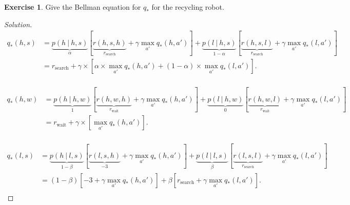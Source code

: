 \documentclass[oneside,11pt]{article}
\theoremstyle{definition}
\newtheorem{exer}[thm]{Exercise}
\newcommand{\qstar}{q_{\ast}}
\newcommand\givenbase[1][]{\:#1\lvert\:}
\let\given\givenbase
\newenvironment{solution}
{\renewcommand\qedsymbol{$\blacksquare$}\begin{proof}[Solution]} {\end{proof}}
\begin{document}
\begin{exer}
Give the Bellman equation for $q_{\ast}$ for the recycling robot.
\end{exer}

\begin{shaded}
\begin{solution} 

\begin{equation*} %
\begin{split}
\qstar(h,s) & = \underbrace{p(h \given h,s)}_{ \alpha} \left [ \underbrace{r(h,s,h)}_{r_{\text{search}}} + \gamma \max_{a'} \qstar(h,a')  \right ] + \underbrace{p(l \given h,s)}_{1- \alpha} \left[ \underbrace{r(h,s,l)}_{r_{\text{search}}} + \gamma \max_{a'} \qstar(l,a') \right ]\\
 & = r_{\text{search}} + \gamma \times \left [ \alpha \times \max_{a'} \qstar(h,a') + (1- \alpha) \times \max_{a'} \qstar(l,a')  \right ]. \\
\end{split}
\end{equation*}


\begin{equation*} %
\begin{split}
\qstar(h,w) & = \underbrace{p(h \given h,w)}_{ 1} \left [ \underbrace{r(h,w,h)}_{r_{\text{wait}}} + \gamma \max_{a'} \qstar(h,a')  \right ] + \underbrace{p(l \given h, w)}_{0} \left[ \underbrace{r(h,w,l)}_{r_{\text{wait}}} + \gamma \max_{a'} \qstar(l,a') \right ]\\
 & = r_{\text{wait}} + \gamma \times \left [ \max_{a'} \qstar(h,a')  \right ]. \\
\end{split}
\end{equation*}

\begin{equation*} %
\begin{split}
\qstar(l,s) & = \underbrace{p(h \given l,s)}_{1- \beta} \left [ \underbrace{r(l,s,h)}_{-3} + \gamma \max_{a'} \qstar(h,a')  \right ] + \underbrace{p(l \given l,s)}_{\beta} \left[ \underbrace{r(l,s,l)}_{r_{\text{search}}} + \gamma \max_{a'} \qstar(l,a') \right ]\\
 & = (1 - \beta) \left [ -3+  \gamma \max_{a'} \qstar(h,a') \right ] + \beta \left [ r_{\text{search}} + \gamma \max_{a'} \qstar(l,a') \right ]. \\
\end{split}
\end{equation*}


\end{solution}
\end{shaded}
\end{document}
